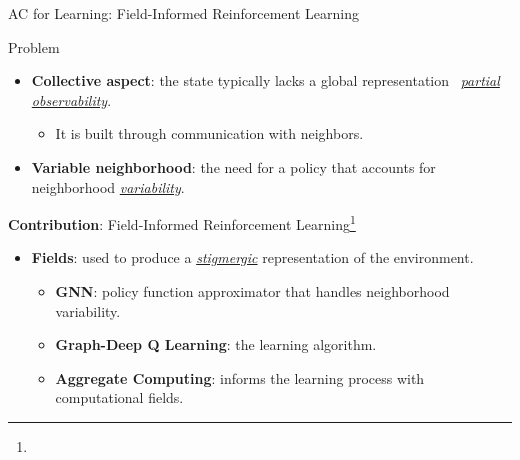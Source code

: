 \documentclass[presentation, 8pt,169]{beamer}\mode<presentation>{\usetheme{AMSBolognaFC}}
\begin{document}
\begin{frame}{AC for Learning: Field-Informed Reinforcement Learning}

  \begin{block}{Problem}
    \begin{itemize}
      \item \textbf{Collective aspect}: the state typically lacks a global representation \faArrowRight \, \emph{\underline{partial observability}}.
        \begin{itemize}
          \item It is built through communication with neighbors.
        \end{itemize}
      \item \textbf{Variable neighborhood}: the need for a policy that accounts for neighborhood \emph{\underline{variability}}.

    \end{itemize}
  \end{block}

  \begin{alertblock}{\textbf{Contribution}: Field-Informed Reinforcement Learning\footnote[frame]{}} 
    \begin{itemize}
      \item \textbf{Fields}: used to produce a \emph{\underline{stigmergic}} representation of the environment.
      \begin{itemize}
        \item \textbf{GNN}: policy function approximator that handles neighborhood variability.
        \item \textbf{Graph-Deep Q Learning}: the learning algorithm.
        \item \textbf{Aggregate Computing}: informs the learning process with computational fields.
      \end{itemize}
    \end{itemize}
  \end{alertblock}

\end{frame}
\end{document}
